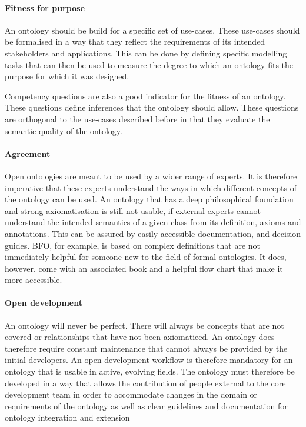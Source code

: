 \paragraph{Fitness for purpose}

An ontology should be build for a specific set of use-cases. These use-cases should be formalised in a way that they reflect the requirements of its intended stakeholders and applications. This can be done by defining specific modelling tasks that can then be used to measure the degree to which an ontology fits the purpose for which it was designed.

Competency questions are also a good indicator for the fitness of an ontology. These questions define inferences that the ontology should allow. These questions are orthogonal to the use-cases described before in that they evaluate the semantic quality of the ontology.

\paragraph{Agreement}

Open ontologies are meant to be used by a wider range of experts. It is therefore imperative that these experts understand the ways in which different concepts of the ontology can be used. An ontology that has a deep philosophical foundation and strong axiomatisation is still not usable, if external experts cannot understand the intended semantics of a given class from its definition, axioms and annotations. This can be assured by easily accessible documentation, and decision guides. BFO, for example, is based on complex definitions that are not immediately helpful for someone new to the field of formal ontologies. It does, however, come with an associated book and a helpful flow chart \cite{bernabe2023method} that make it more accessible.

\paragraph{Open development}

An ontology will never be perfect. There will always be concepts that are not covered or relationships that have not been axiomatieed. An ontology does therefore require constant maintenance that cannot always be provided by the initial developers. An open development workflow is therefore mandatory for an ontology that is usable in active, evolving fields. The ontology must therefore be developed in a way that allows the contribution of people external to the core development team in order to accommodate changes in the domain or requirements of the ontology as well as clear guidelines and documentation for ontology integration and extension%

